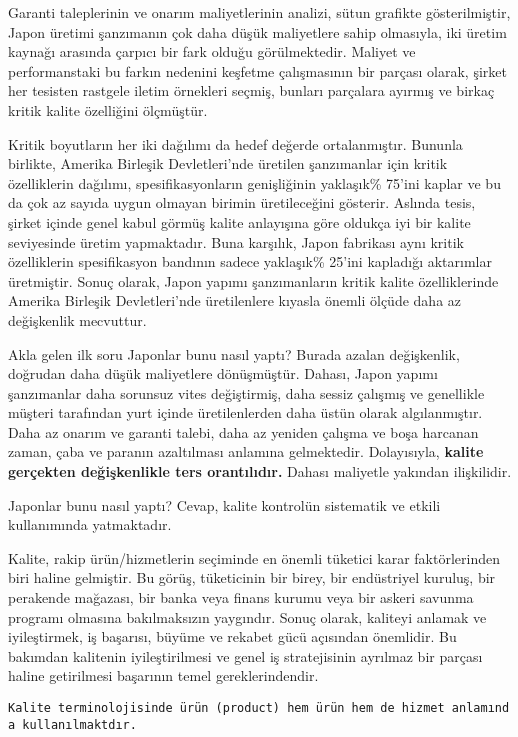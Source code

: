 \documentclass[
]{book}
\begin{document}
Garanti taleplerinin ve onarım maliyetlerinin analizi, sütun grafikte gösterilmiştir, Japon üretimi şanzımanın çok daha düşük maliyetlere sahip olmasıyla, iki üretim kaynağı arasında çarpıcı bir fark olduğu görülmektedir. Maliyet ve performanstaki bu farkın nedenini keşfetme çalışmasının bir parçası olarak, şirket her tesisten rastgele iletim örnekleri seçmiş, bunları parçalara ayırmış ve birkaç kritik kalite özelliğini ölçmüştür.

Kritik boyutların her iki dağılımı da hedef değerde ortalanmıştır. Bununla birlikte, Amerika Birleşik Devletleri'nde üretilen şanzımanlar için kritik özelliklerin dağılımı, spesifikasyonların genişliğinin yaklaşık\% 75'ini kaplar ve bu da çok az sayıda uygun olmayan birimin üretileceğini gösterir. Aslında tesis, şirket içinde genel kabul görmüş kalite anlayışına göre oldukça iyi bir kalite seviyesinde üretim yapmaktadır. Buna karşılık, Japon fabrikası aynı kritik özelliklerin spesifikasyon bandının sadece yaklaşık\% 25'ini kapladığı aktarımlar üretmiştir. Sonuç olarak, Japon yapımı şanzımanların kritik kalite özelliklerinde Amerika Birleşik Devletleri'nde üretilenlere kıyasla önemli ölçüde daha az değişkenlik mecvuttur.

Akla gelen ilk soru Japonlar bunu nasıl yaptı? Burada azalan değişkenlik, doğrudan daha düşük maliyetlere dönüşmüştür. Dahası, Japon yapımı şanzımanlar daha sorunsuz vites değiştirmiş, daha sessiz çalışmış ve genellikle müşteri tarafından yurt içinde üretilenlerden daha üstün olarak algılanmıştır. Daha az onarım ve garanti talebi, daha az yeniden çalışma ve boşa harcanan zaman, çaba ve paranın azaltılması anlamına gelmektedir. Dolayısıyla, \textbf{kalite gerçekten değişkenlikle ters orantılıdır.} Dahası maliyetle yakından ilişkilidir.

Japonlar bunu nasıl yaptı? Cevap, kalite kontrolün sistematik ve etkili kullanımında yatmaktadır.

Kalite, rakip ürün/hizmetlerin seçiminde en önemli tüketici karar faktörlerinden biri haline gelmiştir. Bu görüş, tüketicinin bir birey, bir endüstriyel kuruluş, bir perakende mağazası, bir banka veya finans kurumu veya bir askeri savunma programı olmasına bakılmaksızın yaygındır. Sonuç olarak, kaliteyi anlamak ve iyileştirmek, iş başarısı, büyüme ve rekabet gücü açısından önemlidir. Bu bakımdan kalitenin iyileştirilmesi ve genel iş stratejisinin ayrılmaz bir parçası haline getirilmesi başarının temel gereklerindendir.

\texttt{Kalite\ terminolojisinde\ ürün\ (product)\ hem\ ürün\ hem\ de\ hizmet\ anlamında\ kullanılmaktdır.}
\end{document}

